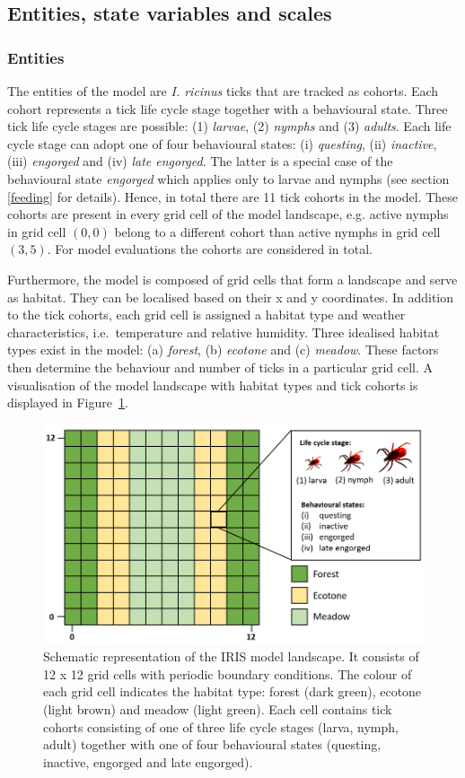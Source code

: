 \documentclass[a4paper, 11pt]{scrartcl}
\begin{document}
\subsection{Entities, state variables and scales}

\subsubsection{Entities}
The entities of the model are \emph{I. ricinus} ticks that are tracked as cohorts. Each cohort represents a tick life cycle stage together with a behavioural state. Three tick life cycle stages are possible: (1) \emph{larvae}, (2) \emph{nymphs} and (3) \emph{adults}. Each life cycle stage can adopt one of four behavioural states: (i) \emph{questing}, (ii) \emph{inactive}, (iii)  \emph{engorged} and (iv) \emph{late engorged}. The latter is a special case of the behavioural state \emph{engorged} which applies only to larvae and nymphs (see section \ref{feeding} for details). Hence, in total there are 11 tick cohorts in the model. These cohorts are present in every grid cell of the model landscape, e.g. active nymphs in grid cell $(0,0)$ belong to a different cohort than active nymphs in grid cell $(3,5)$. For model evaluations the cohorts are considered in total. 

Furthermore, the model is composed of grid cells that form a landscape and serve as habitat. They can be localised based on their x and y coordinates. In addition to the tick cohorts, each grid cell is assigned a habitat type and weather characteristics, i.e.\ temperature and relative humidity. Three idealised habitat types exist in the model: (a) \emph{forest}, (b) \emph{ecotone} and (c) \emph{meadow}. These factors then determine the behaviour and number of ticks in a particular grid cell. A visualisation of the model landscape with habitat types and tick cohorts is displayed in Figure~\ref{fig:iris_landscape}.

\begin{figure}[h!]
	\centering
	\includegraphics[width=0.75\linewidth]{figures/iris_landscape.png}
	\caption[Schematic representation of the IRIS model landscape.]{Schematic representation of the IRIS model landscape. It consists of 12 x 12 grid cells with periodic boundary conditions. The colour of each grid cell indicates the habitat type: forest (dark green), ecotone (light brown) and meadow (light green). Each cell contains tick cohorts consisting of one of three life cycle stages (larva, nymph, adult) together with one of four behavioural states (questing, inactive, engorged and late engorged).}
	\label{fig:iris_landscape}
\end{figure}
\end{document}
